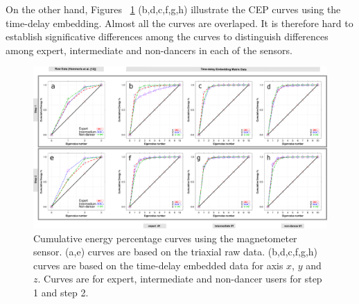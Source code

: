 \documentclass{sigchi}
\begin{document}
On the other hand, Figures ~\ref{fig:cumene} (b,d,c,f,g,h) illustrate the CEP curves using the time-delay embedding.
Almost all the curves are overlaped.
It is therefore hard to establish significative differences among the curves to distinguish differences among expert, intermediate and 
non-dancers in each of the sensors.
\begin{figure}[!t]
\centering    
\includegraphics[width=1.0\textwidth]{cumulative_energy_magdata_drawing}
\caption[PA]{Cumulative energy percentage curves using the magnetometer sensor.
(a,e) curves are based on the triaxial raw data.
(b,d,c,f,g,h) curves are based on the time-delay embedded data for axis $x$, $y$ and $z$.
Curves are for expert, intermediate and non-dancer users for step 1 and step 2.}
\label{fig:cumene}
\end{figure}
% 
% 
% 
\end{document}
